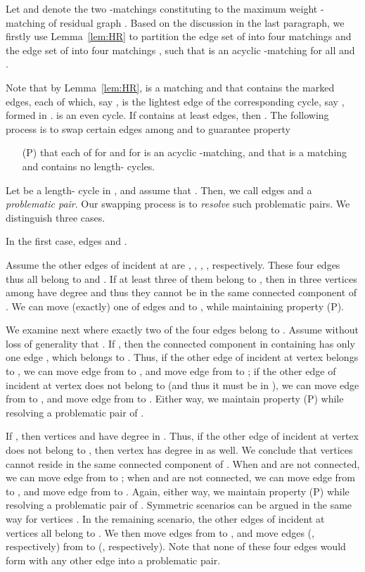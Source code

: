\documentclass[11pt,twoside]{article}\usepackage{amssymb,latexsym,graphicx,hyperref}\usepackage{epstopdf}
\newenvironment{proof}{{\sc Proof. }}{\hfill\vspace{0.2in}}
\begin{document}
\begin{proof}
Let  and  denote the two -matchings constituting to the maximum weight -matching  of residual graph .
Based on the discussion in the last paragraph,
we firstly use Lemma~\ref{lem:HR} to partition the edge set of  into four matchings  and
the edge set of  into four matchings ,
such that  is an acyclic -matching for all  and .

Note that by Lemma~\ref{lem:HR},  is a matching and that  contains the marked edges,
each of which, say , is the lightest edge of the corresponding cycle, say , formed in .
 is an even cycle.
If  contains at least  edges, then .
The following process is to swap certain edges among  and  to guarantee property
\begin{itemize}
\item[(P)]
	that each of  for  and  for  is an acyclic -matching, and
	that  is a matching and  contains no length- cycles.
\end{itemize}

Let  be a length- cycle in , and assume that .
Then, we call edges  and  a {\em problematic pair}.
Our swapping process is to {\em resolve} such problematic pairs.
We distinguish three cases.


In the first case, edges  and .

Assume the other edges of  incident at  are , , , , respectively.
These four edges thus all belong to  and .
If at least three of them belong to , then in  three vertices among  have degree  and
thus they cannot be in the same connected component of .
We can move (exactly) one of edges  and  to , while maintaining property (P).

We examine next where exactly two of the four edges belong to .
Assume without loss of generality that .
If , then the connected component in  containing  has only one edge , which belongs to .
Thus, if the other edge of  incident at vertex  belongs to , we can move edge  from  to ,
and move edge  from  to ;
if the other edge of  incident at vertex  does not belong to  (and thus it must be in ),
we can move edge  from  to , and move edge  from  to .
Either way, we maintain property (P) while resolving a problematic pair of .

If , then vertices  and  have degree  in .
Thus, if the other edge of  incident at vertex  does not belong to , then vertex  has degree  in  as well.
We conclude that vertices  cannot reside in the same connected component of .
When  and  are not connected, we can move edge  from  to ;
when  and  are not connected, we can move edge  from  to , and move edge  from  to .
Again, either way, we maintain property (P) while resolving a problematic pair of .
Symmetric scenarios can be argued in the same way for vertices .
In the remaining scenario, the other edges of  incident at vertices  all belong to .
We then move edges  from  to ,
and move edges  (, respectively) from  to  (, respectively).
Note that none of these four edges would form with any other edge into a problematic pair.


\end{proof}
\end{document}
